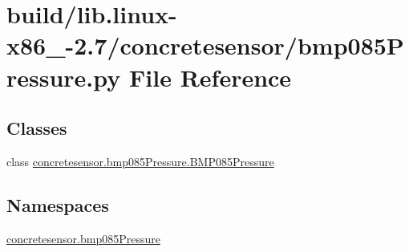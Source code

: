 \hypertarget{build_2lib_8linux-x86__64-2_87_2concretesensor_2bmp085Pressure_8py}{}\section{build/lib.linux-\/x86\+\_-\/2.7/concretesensor/bmp085\+Pressure.py File Reference}
\label{build_2lib_8linux-x86__64-2_87_2concretesensor_2bmp085Pressure_8py}
\subsection*{Classes}
\begin{DoxyCompactItemize}
\item 
class \hyperlink{classconcretesensor_1_1bmp085Pressure_1_1BMP085Pressure}{concretesensor.\+bmp085\+Pressure.\+B\+M\+P085\+Pressure}
\end{DoxyCompactItemize}
\subsection*{Namespaces}
\begin{DoxyCompactItemize}
\item 
 \hyperlink{namespaceconcretesensor_1_1bmp085Pressure}{concretesensor.\+bmp085\+Pressure}
\end{DoxyCompactItemize}
